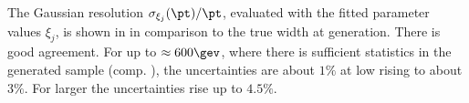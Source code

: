 The Gaussian resolution $\sigma_{\xi_{j}}(\pt)/\pt$, evaluated with the fitted parameter values $\xi_{j}$, is shown in  in comparison to the true width at generation.
There is good agreement.
For \pt up to $\approx 600\gev$, where there is sufficient statistics in the generated sample (comp. ), the uncertainties are about $1\%$ at low \pt rising to about $3\%$.
For larger \pt the uncertainties rise up to $4.5\%$.


\clearpage